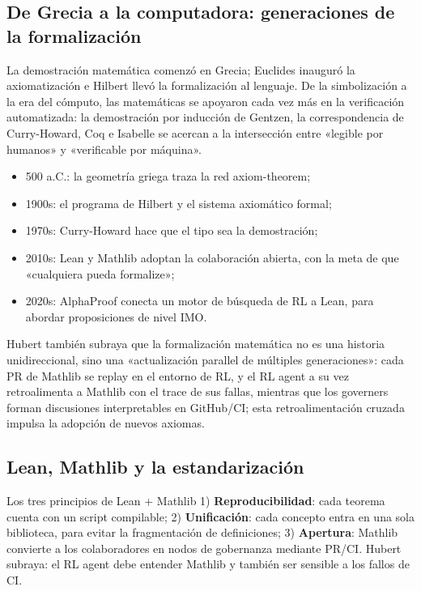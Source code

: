 \documentclass[a4paper]{article}
\begin{document}
\subsection{De Grecia a la computadora: generaciones de la formalización}
La demostración matemática comenzó en Grecia; Euclides inauguró la axiomatización e Hilbert llevó la formalización al lenguaje. De la simbolización a la era del cómputo, las matemáticas se apoyaron cada vez más en la verificación automatizada: la demostración por inducción de Gentzen, la correspondencia de Curry-Howard, Coq e Isabelle se acercan a la intersección entre «legible por humanos» y «verificable por máquina».
\begin{itemize}
    \item 500 a.C.: la geometría griega traza la red axiom-theorem;
    \item 1900s: el programa de Hilbert y el sistema axiomático formal;
    \item 1970s: Curry-Howard hace que el tipo sea la demostración;
    \item 2010s: Lean y Mathlib adoptan la colaboración abierta, con la meta de que «cualquiera pueda formalize»;
    \item 2020s: AlphaProof conecta un motor de búsqueda de RL a Lean, para abordar proposiciones de nivel IMO.
\end{itemize}

Hubert también subraya que la formalización matemática no es una historia unidireccional, sino una «actualización parallel de múltiples generaciones»: cada PR de Mathlib se replay en el entorno de RL, y el RL agent a su vez retroalimenta a Mathlib con el trace de sus fallas, mientras que los governers forman discusiones interpretables en GitHub/CI; esta retroalimentación cruzada impulsa la adopción de nuevos axiomas.

\subsection{Lean, Mathlib y la estandarización}
\begin{importantbox}{Los tres principios de Lean + Mathlib}
1) \textbf{Reproducibilidad}: cada teorema cuenta con un script compilable; 2) \textbf{Unificación}: cada concepto entra en una sola biblioteca, para evitar la fragmentación de definiciones; 3) \textbf{Apertura}: Mathlib convierte a los colaboradores en nodos de gobernanza mediante PR/CI. Hubert subraya: el RL agent debe entender Mathlib y también ser sensible a los fallos de CI.
\end{importantbox}
\end{document}
